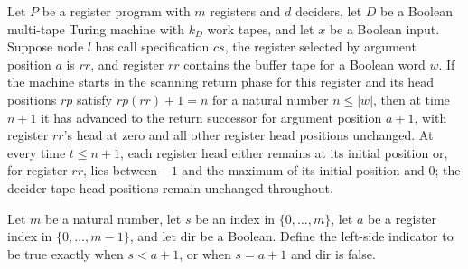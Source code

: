 \begin{lemma}
\label{Complexity.LogProg.retR_scan}
\leanok
{}
Let $P$ be a register program with $m$ registers and $d$ deciders, let $D$ be a Boolean
multi-tape Turing machine with $k_D$ work tapes, and let $x$ be a Boolean input. Suppose
node $l$ has call specification $cs$, the register selected by argument position $a$ is
$rr$, and register $rr$ contains the buffer tape for a Boolean word $w$. If the machine
starts in the scanning return phase for this register and its head positions $rp$
satisfy $rp(rr)+1=n$ for a natural number $n\le |w|$, then at time $n+1$ it has advanced
to the return successor for argument position $a+1$, with register $rr$'s head at zero
and all other register head positions unchanged. At every time $t\le n+1$, each register
head either remains at its initial position or, for register $rr$, lies between $-1$ and
the maximum of its initial position and $0$; the decider tape head positions remain
unchanged throughout.
\end{lemma}

\begin{definition}
\label{Complexity.LogProg.leftSide}
\leanok
Let $m$ be a natural number, let $s$ be an index in $\{0,\ldots,m\}$, let $a$ be a
register index in $\{0,\ldots,m-1\}$, and let $\mathrm{dir}$ be a Boolean. Define the
left-side indicator to be true exactly when $s<a+1$, or when $s=a+1$ and $\mathrm{dir}$
is false.
\end{definition}

